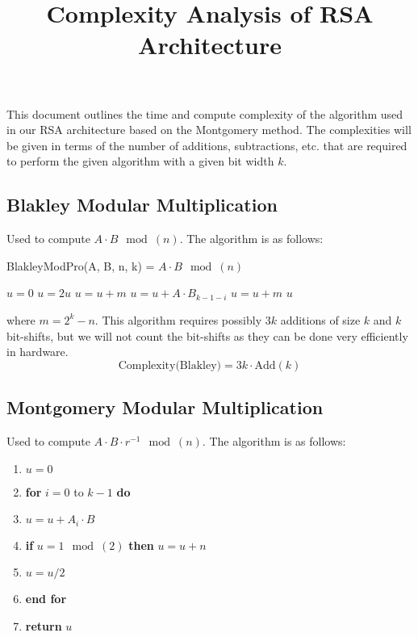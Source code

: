 \documentclass[a4paper,11pt,norsk]{article}
\title{Complexity Analysis of RSA Architecture}
\date{}
\begin{document}
\maketitle

This document outlines the time and compute complexity of the algorithm used 
in our RSA architecture based on the Montgomery method.
The complexities will be given in terms of the number of additions, subtractions,
etc. that are required to perform the given algorithm with a given bit width $k$.


\subsection*{Blakley Modular Multiplication}
Used to compute $A \cdot B \mod{(n)}$. 
The algorithm is as follows:

\begin{algorithm}
\caption{BlakleyModPro(A, B, n, k) = $A \cdot B \mod{(n)}$}
\begin{algorithmic}
    \State $u = 0$
        \State $u = 2u$
            \State $u = u + m$
        \EndIf
        \State $u = u + A \cdot B_{k-1-i}$
            \State $u = u + m$
        \EndIf
    \EndFor
    \State \Return $u$
\end{algorithmic}
\end{algorithm}

where $m = 2^k - n$. This algorithm requires possibly $3k$ additions of size $k$ and $k$ 
bit-shifts, but we will not count the bit-shifts as they can be done very efficiently
in hardware.
\[
    \text{Complexity(Blakley)} = 3k \cdot \text{Add}(k)
\]

\subsection*{Montgomery Modular Multiplication}
Used to compute $A \cdot B \cdot r^{-1} \mod{(n)}$. The algorithm is as follows:
\begin{enumerate}
    \setlength{\itemsep}{0pt}
    \setlength{\parskip}{0pt}
    \item $u = 0$
    \item \textbf{for} $i = 0$ to $k-1$ \textbf{do}
    \item \hspace{0.75cm} $u = u + A_i \cdot B$
    \item \hspace{0.75cm} \textbf{if} $u = 1 \mod{(2)}$ \textbf{then} $u = u + n$
    \item \hspace{0.75cm} $u = u / 2$ 
    \item \textbf{end for}
    \item \textbf{return} $u$
\end{enumerate}
\end{document}
